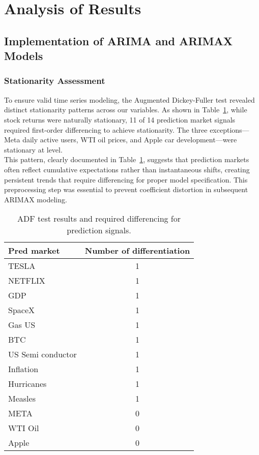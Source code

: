 \documentclass[12pt]{report}
\begin{document}
\newpage
\section{Analysis of Results}

\subsection{Implementation of ARIMA and ARIMAX Models}

\subsubsection{Stationarity Assessment}

To ensure valid time series modeling, the Augmented Dickey-Fuller test revealed distinct stationarity patterns across our variables. As shown in Table~\ref{tab:adf_results}, while stock returns were naturally stationary, 11 of 14 prediction market signals required first-order differencing to achieve stationarity. The three exceptions—Meta daily active users, WTI oil prices, and Apple car development—were stationary at level.\\

This pattern, clearly documented in Table~\ref{tab:adf_results}, suggests that prediction markets often reflect cumulative expectations rather than instantaneous shifts, creating persistent trends that require differencing for proper model specification. This preprocessing step was essential to prevent coefficient distortion in subsequent ARIMAX modeling.

\begin{table}[ht]
    \centering
    \begin{tabular}{|l|c|}
    \hline
    \textbf{Pred market} & \textbf{Number of differentiation} \\
    \hline
    TESLA & 1 \\
    NETFLIX & 1 \\
    GDP & 1 \\
    SpaceX & 1 \\
    Gas US & 1 \\
    BTC & 1 \\
    US Semi conductor & 1 \\
    Inflation & 1 \\
    Hurricanes & 1 \\
    Measles & 1 \\
    META & 0 \\
    WTI Oil & 0 \\
    Apple & 0 \\
    \hline
    \end{tabular}
    \caption{ADF test results and required differencing for prediction signals.}
    \label{tab:adf_results}
    \end{table}
\end{document}
